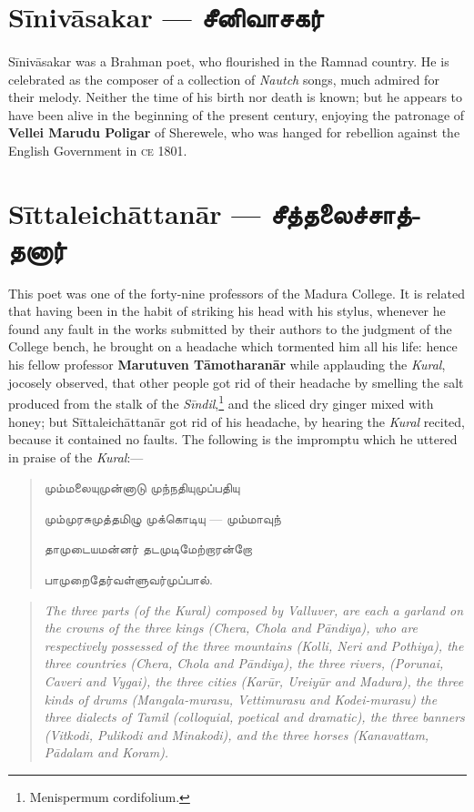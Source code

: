 \documentclass{article}
\newcommand{\TamilText}[1]{\texttamil{#1}}
\newcommand{\TamilBold}[1]{\texttamil{\textbf{#1}}}
\newcommand{\tam}[1]{\TamilText{#1}}
\newcommand{\tambold}[1]{\TamilBold{#1}}
\begin{document}
\section{S\={i}niv\={a}sakar --- \tambold{சீனிவாசகர்}}
\paragraph{}
S\={i}niv\={a}sakar was a Brahman poet, who flourished in the Ramnad country. He is celebrated as the composer of a collection of \emph{Nautch} songs, much admired for their melody. Neither the time of his birth nor death is known; but he appears to have been alive in the beginning of the present century, enjoying the patronage of \textbf{Vellei Marudu Poligar} of Sherewele, who was hanged for rebellion against the English Government in \textsc{ce} 1801.

\section{S\={i}ttaleich\={a}ttan\={a}r --- \tambold{சீத்தலைச்சாத்தனார்}}
\paragraph{}
This poet was one of the forty-nine professors of the Madura College. It is related that having been in the habit of striking his head with his stylus, whenever he found any fault in the works submitted by their authors to the judgment of the College bench, he brought on a headache which tormented him all his life: hence his fellow professor \textbf{Marutuven T\={a}motharan\={a}r} while applauding the \emph{Kural}, jocosely observed, that other people got rid of their headache by smelling the salt produced from the stalk of the \emph{S\={i}ndil},\footnote{Menispermum cordifolium.} and the sliced dry ginger mixed with honey; but S\={i}ttaleich\={a}ttan\={a}r got rid of his headache, by hearing the \emph{Kural} recited, because it contained no faults. The following is the impromptu which he uttered in praise of the \emph{Kural}:---
\begin{quotation}\small
\tam{மும்மலையுமுன்னாடு முந்நதியுமுப்பதியு}

\tam{மும்முரசுமுத்தமிழு முக்கொடியு} --- \tam{மும்மாவுந்}

\tam{தாமுடையமன்னர்‌ தடமுடிமேற்றாரன்‌றோ}

\tam{பாமுறைதேர்வள்ளுவர்முப்பால்‌}.
\end{quotation}
\begin{quotation}\small
\emph{The three parts (of the Kural) composed by Valluver, are each a garland on the crowns of the three kings (Chera, Chola and P\={a}ndiya), who are respectively possessed of the three mountains (Kolli, Neri and Pothiya), the three countries (Chera, Chola and P\={a}ndiya), the three rivers, (Porunai, Caveri and Vygai), the three cities (Kar\={u}r, Ureiy\={u}r and Madura), the three kinds of drums (Mangala-murasu, Vettimurasu and Kodei-murasu) the three dialects of Tamil (colloquial, poetical and dramatic), the three banners (Vitkodi, Pulikodi and Minakodi), and the three horses (Kanavattam, P\={a}dalam and Koram).}
\end{quotation}
\end{document}
